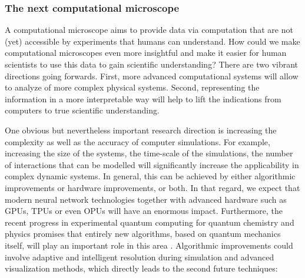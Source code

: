 \subsubsection*{The next computational microscope}\label{NextCMicroscope}
A computational microscope aims to provide data via computation that are not (yet) accessible by experiments that humans can understand. How could we make computational microscopes even more insightful and make it easier for human scientists to use this data to gain scientific understanding? There are two vibrant directions going forwards. First, more advanced computational systems will allow to analyze of more complex physical systems. Second, representing the information in a more interpretable way will help to lift the indications from computers to true scientific understanding.

 One obvious but nevertheless important research direction is increasing the complexity as well as the accuracy of computer simulations\cite{friederich2021machine}. For example, increasing the size of the systems, the time-scale of the simulations, the number of interactions that can be modelled will significantly increase the applicability in complex dynamic systems. In general, this can be achieved by either algorithmic improvements or hardware improvements, or both. In that regard, we expect that modern neural network technologies together with advanced hardware such as GPUs, TPUs or even OPUs \cite{gigan2020artificial,xu202111} will have an enormous impact. Furthermore, the recent progress in experimental quantum computing for quantum chemistry \cite{google2020hartree} and physics\cite{zhang2017observation, schweizer2019floquet, martinez2016real} promises that entirely new algorithms, based on quantum mechanics itself, will play an important role in this area \cite{cao2019quantum,gross2017quantum}. Algorithmic improvements could involve adaptive and intelligent resolution during simulation and advanced visualization methods\cite{de2005contextual}, which directly leads to the second future techniques:

